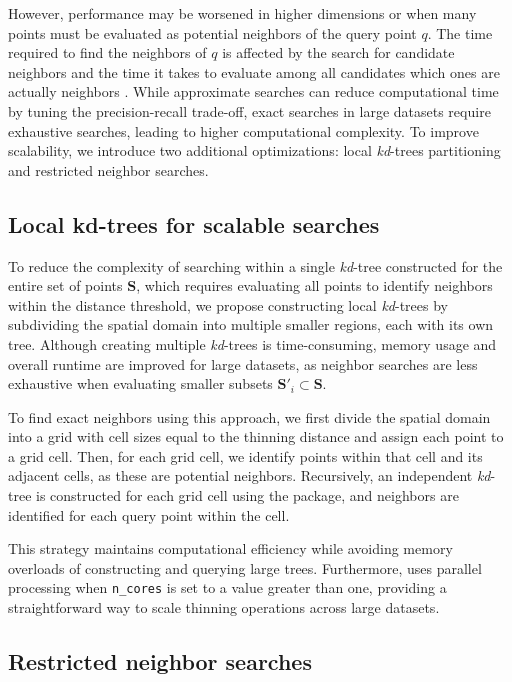 However, performance may be worsened in higher dimensions or when many points must be evaluated as potential neighbors of the query point \(q\). The time required to find the neighbors of \(q\) is affected by the search for candidate neighbors and the time it takes to evaluate among all candidates which ones are actually neighbors \citep{ram2019revisiting}. While approximate searches can reduce computational time by tuning the precision-recall trade-off, exact searches in large datasets require exhaustive searches, leading to higher computational complexity. To improve scalability, we introduce two additional optimizations: local \emph{kd}-trees partitioning and restricted neighbor searches.

\subsection{Local kd-trees for scalable searches}\label{local-kd-trees-for-scalable-searches}

To reduce the complexity of searching within a single \emph{kd}-tree constructed for the entire set of points \(\mathbf{S}\), which requires evaluating all points to identify neighbors within the distance threshold, we propose constructing local \emph{kd}-trees by subdividing the spatial domain into multiple smaller regions, each with its own tree. Although creating multiple \emph{kd}-trees is time-consuming, memory usage and overall runtime are improved for large datasets, as neighbor searches are less exhaustive when evaluating smaller subsets \(\mathbf{S}'_i \subset \mathbf{S}\).

To find exact neighbors using this approach, we first divide the spatial domain into a grid with cell sizes equal to the thinning distance and assign each point to a grid cell. Then, for each grid cell, we identify points within that cell and its adjacent cells, as these are potential neighbors. Recursively, an independent \emph{kd}-tree is constructed for each grid cell using the  package, and neighbors are identified for each query point within the cell.

This strategy maintains computational efficiency while avoiding memory overloads of constructing and querying large trees. Furthermore,  uses parallel processing when \texttt{n\_cores} is set to a value greater than one, providing a straightforward way to scale thinning operations across large datasets.

\subsection{Restricted neighbor searches}\label{restricted-neighbor-searches}

